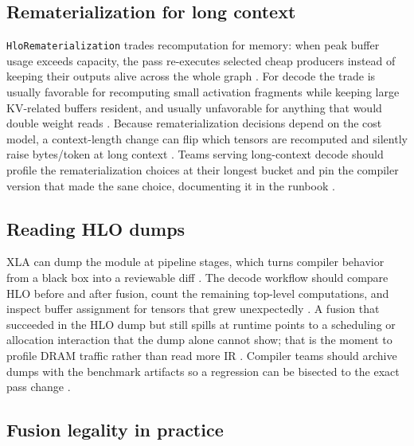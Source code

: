 \subsection{Rematerialization for long context}

\texttt{HloRematerialization} trades recomputation for memory: when peak buffer usage exceeds capacity, the pass re-executes selected cheap producers instead of keeping their outputs alive across the whole graph \citep{openxla2024}. For decode the trade is usually favorable for recomputing small activation fragments while keeping large KV-related buffers resident, and usually unfavorable for anything that would double weight reads \citep{memoryfloor2026,kwon2023vllm}. Because rematerialization decisions depend on the cost model, a context-length change can flip which tensors are recomputed and silently raise bytes/token at long context \citep{patel2025llminference,taxbreak2026}. Teams serving long-context decode should profile the rematerialization choices at their longest bucket and pin the compiler version that made the sane choice, documenting it in the runbook \citep{openxla2024,yirage2026}.

\subsection{Reading HLO dumps}

XLA can dump the module at pipeline stages, which turns compiler behavior from a black box into a reviewable diff \citep{openxla2024}. The decode workflow should compare HLO before and after fusion, count the remaining top-level computations, and inspect buffer assignment for tensors that grew unexpectedly \citep{chen2020compilerbasedhardw,patel2025llminference}. A fusion that succeeded in the HLO dump but still spills at runtime points to a scheduling or allocation interaction that the dump alone cannot show; that is the moment to profile DRAM traffic rather than read more IR \citep{memoryfloor2026,taxbreak2026}. Compiler teams should archive dumps with the benchmark artifacts so a regression can be bisected to the exact pass change \citep{yirage2026,chen2020compilerbasedhardw}.

\subsection{Fusion legality in practice}


